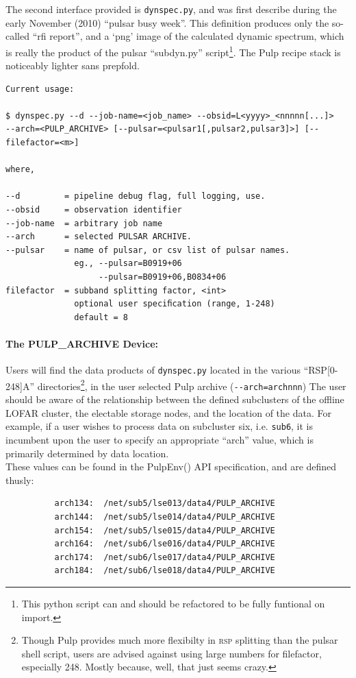 \documentclass[a4paper,10pt,bibtotoc]{scrartcl}
\begin{document}
The second interface provided is \verb|dynspec.py|, and was first
describe during the early November (2010) ``pulsar busy week''.  This
definition produces only the so-called ``rfi report'', and a `png'
image of the calculated dynamic spectrum, which is really
the product of the pulsar ``subdyn.py'' script\footnote{This python
  script can and should be refactored to be fully funtional on import.}.
The Pulp recipe stack is noticeably lighter sans prepfold.
\begin{verbatim}
Current usage:

$ dynspec.py --d --job-name=<job_name> --obsid=L<yyyy>_<nnnnn[...]>
--arch=<PULP_ARCHIVE> [--pulsar=<pulsar1[,pulsar2,pulsar3]>] [--filefactor=<m>]

where,

--d         = pipeline debug flag, full logging, use.
--obsid     = observation identifier          
--job-name  = arbitrary job name             
--arch      = selected PULSAR ARCHIVE.
--pulsar    = name of pulsar, or csv list of pulsar names.
              eg., --pulsar=B0919+06
                   --pulsar=B0919+06,B0834+06
filefactor  = subband splitting factor, <int>
              optional user speciﬁcation (range, 1-248)
              default = 8
\end{verbatim}
\paragraph{The PULP\_ARCHIVE Device:}Users will find the data products of \verb|dynspec.py| located in the
various ``RSP[0-248]A'' directories\footnote{Though Pulp provides
  much more flexibilty in \textsc{rsp} splitting than the pulsar shell
  script, users are advised against using large numbers for
  filefactor, especially 248.  Mostly because, well, that just seems
  crazy.}, in the user selected Pulp archive (\verb|--arch=archnnn|) The user should be aware of the relationship between the defined subclusters of the offline LOFAR cluster, the electable storage nodes, and the location of the data.  For example, if a user wishes to process data on subcluster six, i.e. \verb|sub6|, it is incumbent upon the user to specify an appropriate ``arch'' value,  which is primarily determined by data location.  \\
These values can be found in the PulpEnv() API specification, and are defined thusly:
\begin{verbatim}
          arch134:  /net/sub5/lse013/data4/PULP_ARCHIVE
          arch144:  /net/sub5/lse014/data4/PULP_ARCHIVE
          arch154:  /net/sub5/lse015/data4/PULP_ARCHIVE
          arch164:  /net/sub6/lse016/data4/PULP_ARCHIVE
          arch174:  /net/sub6/lse017/data4/PULP_ARCHIVE
          arch184:  /net/sub6/lse018/data4/PULP_ARCHIVE
\end{verbatim}
\end{document}
